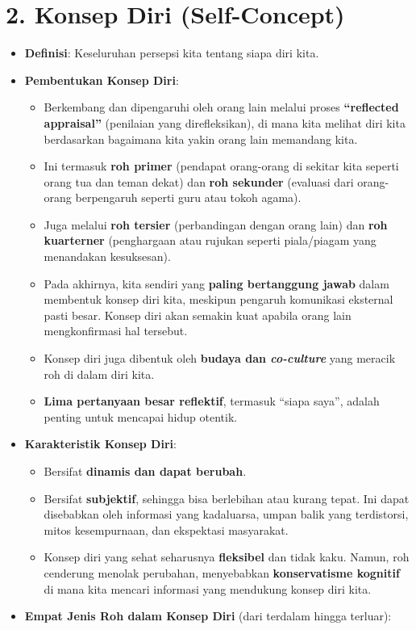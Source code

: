 \documentclass[
  letterpaper,
  DIV=11,
  numbers=noendperiod]{scrreprt}
\providecommand{\tightlist}{%
  \setlength{\itemsep}{0pt}\setlength{\parskip}{0pt}}
\begin{document}
\section{2. Konsep Diri (Self-Concept)}\label{konsep-diri-self-concept}

\begin{itemize}
\tightlist
\item
  \textbf{Definisi}: Keseluruhan persepsi kita tentang siapa diri kita.
\item
  \textbf{Pembentukan Konsep Diri}:

  \begin{itemize}
  \tightlist
  \item
    Berkembang dan dipengaruhi oleh orang lain melalui proses
    \textbf{``reflected appraisal''} (penilaian yang direfleksikan), di
    mana kita melihat diri kita berdasarkan bagaimana kita yakin orang
    lain memandang kita.
  \item
    Ini termasuk \textbf{roh primer} (pendapat orang-orang di sekitar
    kita seperti orang tua dan teman dekat) dan \textbf{roh sekunder}
    (evaluasi dari orang-orang berpengaruh seperti guru atau tokoh
    agama).
  \item
    Juga melalui \textbf{roh tersier} (perbandingan dengan orang lain)
    dan \textbf{roh kuarterner} (penghargaan atau rujukan seperti
    piala/piagam yang menandakan kesuksesan).
  \item
    Pada akhirnya, kita sendiri yang \textbf{paling bertanggung jawab}
    dalam membentuk konsep diri kita, meskipun pengaruh komunikasi
    eksternal pasti besar. Konsep diri akan semakin kuat apabila orang
    lain mengkonfirmasi hal tersebut.
  \item
    Konsep diri juga dibentuk oleh \textbf{budaya dan \emph{co-culture}}
    yang meracik roh di dalam diri kita.
  \item
    \textbf{Lima pertanyaan besar reflektif}, termasuk ``siapa saya'',
    adalah penting untuk mencapai hidup otentik.
  \end{itemize}
\item
  \textbf{Karakteristik Konsep Diri}:

  \begin{itemize}
  \tightlist
  \item
    Bersifat \textbf{dinamis dan dapat berubah}.
  \item
    Bersifat \textbf{subjektif}, sehingga bisa berlebihan atau kurang
    tepat. Ini dapat disebabkan oleh informasi yang kadaluarsa, umpan
    balik yang terdistorsi, mitos kesempurnaan, dan ekspektasi
    masyarakat.
  \item
    Konsep diri yang sehat seharusnya \textbf{fleksibel} dan tidak kaku.
    Namun, roh cenderung menolak perubahan, menyebabkan
    \textbf{konservatisme kognitif} di mana kita mencari informasi yang
    mendukung konsep diri kita.
  \end{itemize}
\item
  \textbf{Empat Jenis Roh dalam Konsep Diri} (dari terdalam hingga
  terluar):


\end{itemize}
\end{document}
